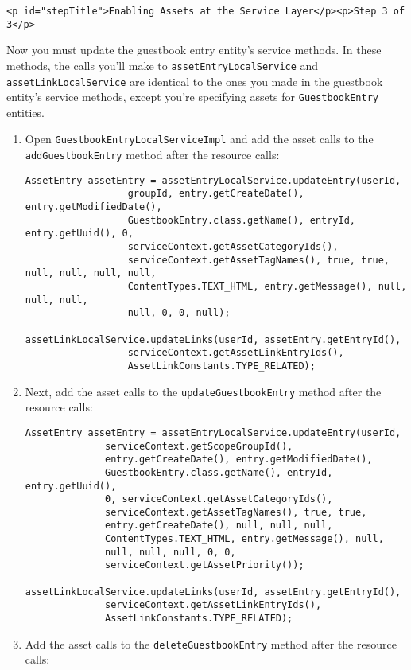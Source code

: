 \begin{verbatim}
<p id="stepTitle">Enabling Assets at the Service Layer</p><p>Step 3 of 3</p>
\end{verbatim}

Now you must update the guestbook entry entity's service methods. In
these methods, the calls you'll make to \texttt{assetEntryLocalService}
and \texttt{assetLinkLocalService} are identical to the ones you made in
the guestbook entity's service methods, except you're specifying assets
for \texttt{GuestbookEntry} entities.

\begin{enumerate}
\def\labelenumi{\arabic{enumi}.}
\item
  Open \texttt{GuestbookEntryLocalServiceImpl} and add the asset calls
  to the \texttt{addGuestbookEntry} method after the resource calls:

\begin{verbatim}
AssetEntry assetEntry = assetEntryLocalService.updateEntry(userId,
                  groupId, entry.getCreateDate(), entry.getModifiedDate(),
                  GuestbookEntry.class.getName(), entryId, entry.getUuid(), 0,
                  serviceContext.getAssetCategoryIds(),
                  serviceContext.getAssetTagNames(), true, true, null, null, null, null,
                  ContentTypes.TEXT_HTML, entry.getMessage(), null, null, null,
                  null, 0, 0, null);

assetLinkLocalService.updateLinks(userId, assetEntry.getEntryId(),
                  serviceContext.getAssetLinkEntryIds(),
                  AssetLinkConstants.TYPE_RELATED);
\end{verbatim}
\item
  Next, add the asset calls to the \texttt{updateGuestbookEntry} method
  after the resource calls:

\begin{verbatim}
AssetEntry assetEntry = assetEntryLocalService.updateEntry(userId,
              serviceContext.getScopeGroupId(),
              entry.getCreateDate(), entry.getModifiedDate(),
              GuestbookEntry.class.getName(), entryId, entry.getUuid(),
              0, serviceContext.getAssetCategoryIds(),
              serviceContext.getAssetTagNames(), true, true,
              entry.getCreateDate(), null, null, null,
              ContentTypes.TEXT_HTML, entry.getMessage(), null,
              null, null, null, 0, 0,
              serviceContext.getAssetPriority());

assetLinkLocalService.updateLinks(userId, assetEntry.getEntryId(),
              serviceContext.getAssetLinkEntryIds(),
              AssetLinkConstants.TYPE_RELATED);
\end{verbatim}
\item
  Add the asset calls to the \texttt{deleteGuestbookEntry} method after
  the resource calls:


\end{enumerate}
